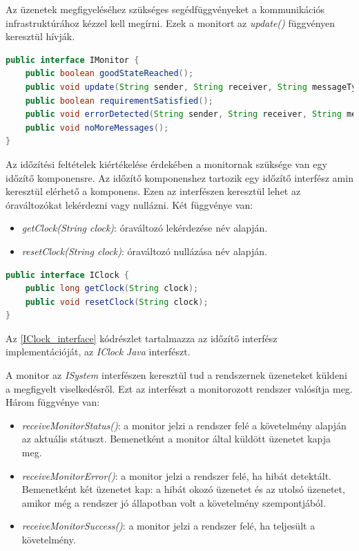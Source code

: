 Az üzenetek megfigyeléséhez szükséges segédfüggvényeket a kommunikációs infrastruktúrához kézzel kell megírni.
Ezek a monitort az \textit{update()} függvényen keresztül hívják.

\begin{lstlisting}[language=java,frame=single, float=h!, caption={Monitor interfész Java implementációja.},captionpos=b,label=IMonitor_interface]
public interface IMonitor {
	public boolean goodStateReached();
	public void update(String sender, String receiver, String messageType, Map<String, Object> parameters);
	public boolean requirementSatisfied();
	public void errorDetected(String sender, String receiver, String messageType, Map<String, Object> parameters);
	public void noMoreMessages();
}
\end{lstlisting}

Az időzítési feltételek kiértékelése érdekében a monitornak szüksége van egy időzítő komponensre.
Az időzítő komponenshez tartozik egy időzítő interfész amin keresztül elérhető a komponens.
Ezen az interfészen keresztül lehet az óraváltozókat lekérdezni vagy nullázni.
Két függvénye van:

\begin{itemize}
    \item \textit{getClock(String clock)}: óraváltozó lekérdezése név alapján.
    \item \textit{resetClock(String clock)}: óraváltozó nullázása név alapján.
\end{itemize}

\begin{lstlisting}[language=java,frame=single, float=h!, caption={Időzitő interfész Java implementációja.},captionpos=b,label=IClock_interface]
public interface IClock {
	public long getClock(String clock);
	public void resetClock(String clock);
}
\end{lstlisting}

Az \ref{IClock_interface} kódrészlet tartalmazza az időzítő interfész implementációját, az \textit{IClock} \textit{Java} interfészt.

A monitor az \textit{ISystem} interfészen keresztül tud a rendszernek üzeneteket küldeni a megfigyelt viselkedésről.
Ezt az interfészt a monitorozott rendszer valósítja meg.
Három függvénye van:
\begin{itemize}
	\item \textit{receiveMonitorStatus()}: a monitor jelzi a rendszer felé a követelmény alapján az aktuális státuszt.
	Bemenetként a monitor által küldött üzenetet kapja meg.
	\item \textit{receiveMonitorError()}: a monitor jelzi a rendszer felé, ha hibát detektált.
	Bemenetként két üzenetet kap: a hibát okozó üzenetet és az utolsó üzenetet, amikor még a rendszer jó állapotban volt a követelmény szempontjából.
	\item \textit{receiveMonitorSuccess()}: a monitor jelzi a rendszer felé, ha teljesült a követelmény.
\end{itemize}

